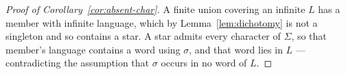 \begin{proof}[Proof of Corollary~\ref{cor:absent-char}]
A finite union covering an infinite $L$ has a member with infinite language, which by
Lemma~\ref{lem:dichotomy} is not a singleton and so contains a star. A star admits every
character of $\Sigma$, so that member's language contains a word using $\sigma$, and
that word lies in $L$ --- contradicting the assumption that $\sigma$ occurs in no word
of $L$.
\end{proof}
